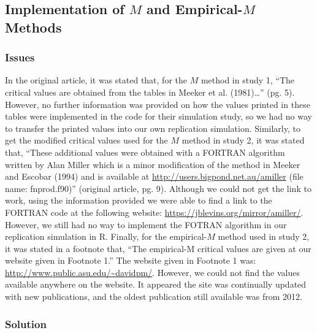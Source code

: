 \documentclass[10,a4paperpaper,]{article}
\begin{document}
\subsection{Implementation of $M$ and Empirical-$M$ Methods}\subsubsection{Issues}

In the original article, it was stated that, for the \(M\) method in
study 1, ``The critical values are obtained from the tables in Meeker et
al. (1981)\ldots{}'' (pg. 5). However, no further information was
provided on how the values printed in these tables were implemented in
the code for their simulation study, so we had no way to transfer the
printed values into our own replication simulation. Similarly, to get
the modified critical values used for the \(M\) method in study 2, it
was stated that, ``These additional values were obtained with a FORTRAN
algorithm written by Alan Miller which is a minor modification of the
method in Meeker and Escobar (1994) and is available at
\url{http://users.bigpond.net.au/amiller} (file name: fnprod.f90)''
(original article, pg. 9). Although we could not get the link to work,
using the information provided we were able to find a link to the
FORTRAN code at the following website:
\url{https://jblevins.org/mirror/amiller/}. However, we still had no way
to implement the FOTRAN algorithm in our replication simulation in R.
Finally, for the empirical-\(M\) method used in study 2, it was stated
in a footnote that, ``The empirical-M critical values are given at our
website given in Footnote 1.'' The website given in Footnote 1 was:
\url{http://www.public.asu.edu/~davidpm/}. However, we could not find
the values available anywhere on the website. It appeared the site was
continually updated with new publications, and the oldest publication
still available was from 2012.

\subsubsection{Solution}
\end{document}
